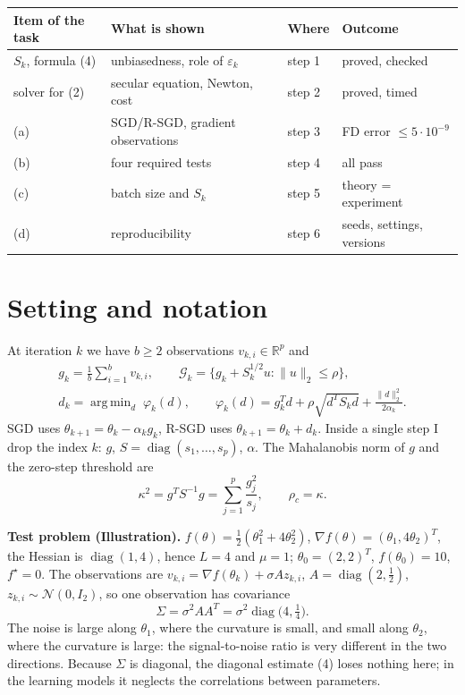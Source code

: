 \documentclass[11pt,a4paper]{article}
\newcommand{\G}{\mathcal{G}_k}
\newcommand{\norm}[1]{\lVert #1\rVert_2}
\DeclareMathOperator*{\argmin}{arg\,min}
\DeclareMathOperator{\diag}{diag}
\begin{document}
\begin{center}
\begin{tabular}{@{}llll@{}}
\toprule
Item of the task & What is shown & Where & Outcome \\
\midrule
$S_k$, formula (4) & unbiasedness, role of $\varepsilon_k$ & step 1 & proved, checked \\
solver for (2) & secular equation, Newton, cost & step 2 & proved, timed \\
(a) & SGD/R-SGD, gradient observations & step 3 & FD error $\le 5\cdot10^{-9}$ \\
(b) & four required tests & step 4 & all pass \\
(c) & batch size and $S_k$ & step 5 & theory = experiment \\
(d) & reproducibility & step 6 & seeds, settings, versions \\
\bottomrule
\end{tabular}
\end{center}

\section*{Setting and notation}

At iteration $k$ we have $b\ge2$ observations $v_{k,i}\in\mathbb R^p$ and
\begin{gather*}
g_k=\frac1b\sum_{i=1}^b v_{k,i},\qquad
\G=\{g_k+S_k^{1/2}u:\norm{u}\le\rho\},\\
d_k=\argmin_d\;\varphi_k(d),\qquad
\varphi_k(d)=g_k^Td+\rho\sqrt{d^TS_kd}+\frac{\norm{d}^2}{2\alpha_k}.
\end{gather*}
SGD uses $\theta_{k+1}=\theta_k-\alpha_kg_k$, R-SGD uses $\theta_{k+1}=\theta_k+d_k$.
Inside a single step I drop the index $k$: $g$, $S=\diag(s_1,\dots,s_p)$, $\alpha$.
The Mahalanobis norm of $g$ and the zero-step threshold are
\begin{equation*}
\kappa^2=g^TS^{-1}g=\sum_{j=1}^p\frac{g_j^2}{s_j},\qquad \rho_c=\kappa .
\end{equation*}

\textbf{Test problem (Illustration).}
$f(\theta)=\tfrac12(\theta_1^2+4\theta_2^2)$, $\nabla f(\theta)=(\theta_1,4\theta_2)^T$,
the Hessian is $\diag(1,4)$, hence $L=4$ and $\mu=1$; $\theta_0=(2,2)^T$,
$f(\theta_0)=10$, $f^\star=0$. The observations are
$v_{k,i}=\nabla f(\theta_k)+\sigma Az_{k,i}$, $A=\diag(2,\tfrac12)$,
$z_{k,i}\sim\mathcal N(0,I_2)$, so one observation has covariance
\begin{equation*}
\Sigma=\sigma^2AA^T=\sigma^2\diag\big(4,\tfrac14\big).
\end{equation*}
The noise is large along $\theta_1$, where the curvature is small, and small along
$\theta_2$, where the curvature is large: the signal-to-noise ratio is very different
in the two directions. Because $\Sigma$ is diagonal, the diagonal estimate (4) loses
nothing here; in the learning models it neglects the correlations between
parameters.
\end{document}
